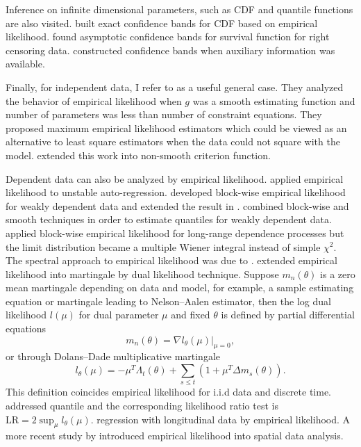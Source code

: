 Inference on infinite dimensional parameters, such as CDF and quantile
functions are also visited. \citet{owen1995nonparametric} built exact
confidence bands for CDF based on empirical likelihood. \citet{hollander1997likelihood}
found asymptotic confidence bands for survival function for right
censoring data. \citet{zhang1996confidence,zhang1999bootstrapping}
constructed confidence bands when auxiliary information was available. 

Finally, for independent data, I refer to \citet{qin1994empirical}
as a useful general case. They analyzed the behavior of empirical
likelihood when $g$ was a smooth estimating function and number of
parameters was less than number of constraint equations. They proposed
maximum empirical likelihood estimators which could be viewed as
an alternative to least square estimators when the data could not square
with the model. \citet{molanes2009empirical} extended this work into
non-smooth criterion function. 

Dependent data can also be analyzed by empirical likelihood. \citet{chuang2002empirical}
applied empirical likelihood to unstable auto-regression. \citet{kitamura1997empirical}
developed block-wise empirical likelihood for weakly dependent data
and extended the result in \citet{qin1994empirical}. \citet{chen2009smoothed}
combined block-wise and smooth techniques in order to estimate quantiles
for weakly dependent data. \citet{nordman2007empirical} applied block-wise
empirical likelihood for long-range dependence processes but the limit
distribution became a multiple Wiener integral instead of simple $\chi^{2}$.
The spectral approach to empirical likelihood was due to \citet{monti1997empirical}.
\citet{mykland1995dual} extended empirical likelihood into martingale
by dual likelihood technique. Suppose $m_{n}\left(\theta\right)$
is a zero mean martingale depending on data and model, for example,
a sample estimating equation or martingale leading to Nelson--Aalen
estimator, then the log dual likelihood $l\left(\mu\right)$ for dual
parameter $\mu$ and fixed $\theta$ is defined by partial differential
equations 
\[
m_{n}\left(\theta\right)=\left.\nabla l_{\theta}\left(\mu\right)\right|_{\mu=0},
\]
 or through Dolans--Dade multiplicative martingale 
\[
l_{\theta}\left(\mu\right)=-\mu^{T}\Lambda_{t}\left(\theta\right)+\sum_{s\le t}\left(1+\mu^{T}\Delta m_{s}\left(\theta\right)\right).
\]
This definition coincides empirical likelihood for i.i.d data and discrete time. \citet{wang2011empirical} addressed quantile
and the corresponding likelihood ratio test is $\mathrm{LR}=2\sup_{\mu}l_{\theta}\left(\mu\right)$.
regression with longitudinal data by empirical likelihood. A more
recent study by \citet{bandyopadhyay2015frequency} introduced empirical
likelihood into spatial data analysis. 


